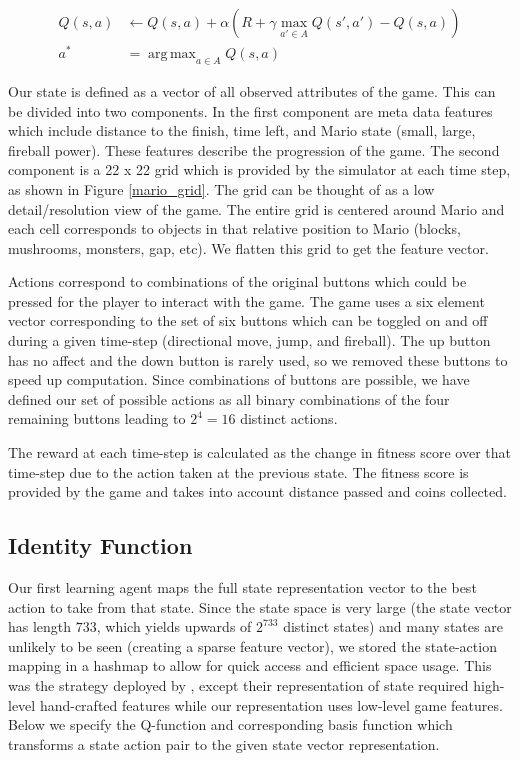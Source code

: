 \documentclass[12pt]{article}
\DeclareMathOperator*{\argmax}{arg\,max}
\begin{document}
\begin{align*}
Q(s,a) &\leftarrow Q(s,a) + \alpha (R + \gamma \max_{a' \in A} Q(s',a') - Q(s,a))\\
a^* &= \argmax_{a \in A} Q(s,a)
\end{align*}

Our state is defined as a vector of all observed attributes of the game. This can be divided into two components. In the first component are meta data features which include distance to the finish, time left, and Mario state (small, large, fireball power). These features describe the progression of the game. The second component is a 22 x 22 grid which is provided by the simulator at each time step, as shown in Figure \ref{mario_grid}. The grid can be thought of as a low detail/resolution view of the game. The entire grid is centered around Mario and each cell corresponds to objects in that relative position to Mario (blocks, mushrooms, monsters, gap, etc). We flatten this grid to get the feature vector.

Actions correspond to combinations of the original buttons which could be pressed for the player to interact with the game. The game uses a six element vector corresponding to the set of six buttons which can be toggled on and off during a given time-step (directional move, jump, and fireball). The up button has no affect and the down button is rarely used, so we removed these buttons to speed up computation. Since combinations of buttons are possible, we have defined our set of possible actions as all binary combinations of the four remaining buttons leading to $2^4 = 16$ distinct actions.

The reward at each time-step is calculated as the change in fitness score over that time-step due to the action taken at the previous state. The fitness score is provided by the game and takes into account distance passed and coins collected.

\subsection{Identity Function}

Our first learning agent maps the full state representation vector to the best action to take from that state. Since the state space is very large (the state vector has length $733$, which yields upwards of $2^{733}$ distinct states) and many states are unlikely to be seen (creating a sparse feature vector), we stored the state-action mapping in a hashmap to allow for quick access and efficient space usage. This was the strategy deployed by \cite{liao2012cs229}, except their representation of state required high-level hand-crafted features while our representation uses low-level game features. Below we specify the Q-function and corresponding basis function which transforms a state action pair to the given state vector representation.
\end{document}
